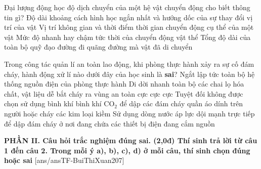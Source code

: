 	\begin{ex}%
		Đại lượng động học độ dịch chuyển của một hệ vật chuyển động cho biết thông tin gì?
		\choice
		{\True Độ dài khoảng cách hình học ngắn nhất và hướng dốc của sự thay đổi vị trí của vật}
		{Vị trí không gian và thời điểm thời gian chuyển động cụ thể của một vật}
		{Mức độ nhanh hay chậm tức thời của chuyển động vật thể}
		{Tổng độ dài của toàn bộ quỹ đạo đường đi quãng đường mà vật đã di chuyển}
	\end{ex}
	
	\begin{ex}%
		Trong công tác quản lí an toàn lao động, khi phòng thực hành xảy ra sự cố đám cháy, hành động xử lí nào dưới đây của học sinh là \textbf{sai}?
		\choice
		{Ngắt lập tức toàn bộ hệ thống nguồn điện của phòng thực hành}
		{Di dời nhanh toàn bộ các chai lọ hóa chất, vật liệu dễ bắt cháy ra vùng an toàn cực cực cực}
		{Tuyệt đối không được chọn sử dụng bình khí bình khí $\text{CO}_2$ để dập các đám cháy quần áo dính trên người hoặc cháy các kim loại kiềm}
		{\True Sử dụng dòng nước áp lực dội mạnh trực tiếp để dập đám cháy ở nơi đang chứa các thiết bị điện đang cắm nguồn}
	\end{ex}
	
	
	\noindent \textbf{PHẦN II. Câu hỏi trắc nghiệm đúng sai. (2,0đ) Thí sinh trả lời từ câu 1 đến câu 2. Trong mỗi ý a), b), c), d) ở mỗi câu, thí sinh chọn đúng hoặc sai}
	[ans/ansTF-BuiThiXuan207]
	
